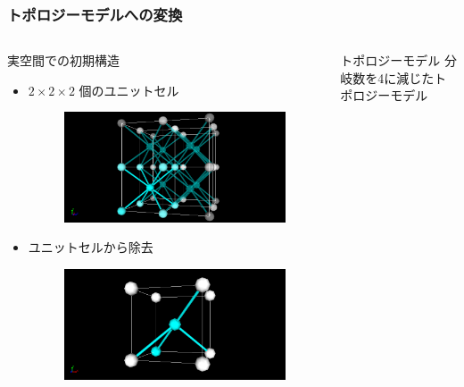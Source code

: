 \documentclass[11pt, dvipdfmx]{beamer}
\begin{document}
\begin{frame}
\frametitle{トポロジーモデルへの変換}
\begin{columns}[totalwidth=1\textwidth]
\begin{block}{実空間での初期構造}
\small
\begin{itemize}
\item
$2\times2\times2$ 個のユニットセル
\vspace{-2mm}
\begin{figure}
\centering
\includegraphics[width=0.8\columnwidth]{./fig/8_per.png}
\end{figure}
\vspace{-2mm}
\item
\vspace{-2mm}
ユニットセルから除去
\vspace{-2mm}
\begin{figure}
\centering
\includegraphics[width=0.8\columnwidth]{./fig/8_4.png}
\end{figure}
\end{itemize}
\end{block}
\begin{exampleblock}{トポロジーモデル}
\small
分岐数を4に減じたトポロジーモデル
\vspace{-2mm}
\begin{figure}
\centering

\end{figure}
\end{exampleblock}
\end{columns}
\end{frame}
\end{document}
